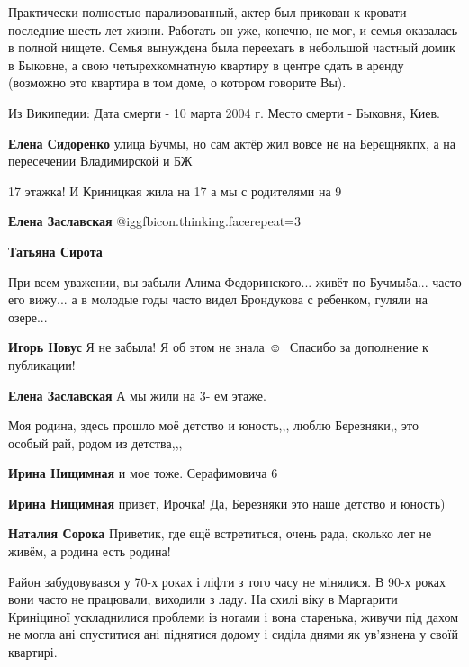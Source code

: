 \begin{itemize}
\begin{itemize}
\begin{itemize}
Практически полностью парализованный, актер был прикован к кровати последние
шесть лет жизни. Работать он уже, конечно, не мог, и семья оказалась в полной
нищете. Семья вынуждена была переехать в небольшой частный домик в Быковне, а
свою четырехкомнатную квартиру в центре сдать в аренду (возможно это квартира в
том доме, о котором говорите Вы).

Из Википедии:
Дата смерти -
10 марта 2004 г.
Место смерти -
Быковня, Киев.

\end{itemize} %

\textbf{Елена Сидоренко} улица Бучмы, но сам актёр жил вовсе не на Берещнякпх, а на пересечении Владимирской и БЖ
\end{itemize} %

17 этажка! И Криницкая жила на 17 а мы с родителями на 9

\begin{itemize} %
\textbf{Елена Заславская}  @igg{fbicon.thinking.face}{repeat=3} 

\textbf{Татьяна Сирота} 

При всем уважении, вы забыли Алима Федоринского... живёт по Бучмы5а... часто его
вижу... а в молодые годы часто видел Брондукова с ребенком, гуляли на озере...


\textbf{Игорь Новус} 
Я не забыла! Я об этом не знала ☺ ️ 
Спасибо за дополнение к публикации!

\textbf{Елена Заславская}
А мы жили на 3- ем этаже.
\end{itemize} %

Моя родина, здесь прошло моё детство и юность,,, люблю Березняки,, это особый
рай, родом из детства,,,

\begin{itemize} %
\textbf{Ирина Нищимная} и мое тоже. Серафимовича 6

\textbf{Ирина Нищимная} привет, Ирочка! Да, Березняки это наше детство и юность)

\textbf{Наталия Сорока} Приветик, где ещё встретиться, очень рада, сколько лет не живём, а родина есть родина!
\end{itemize} %


Район забудовувався у 70-х роках і ліфти з того часу не мінялися. В 90-х роках
вони часто не працювали, виходили з ладу. На схилі віку в Маргарити Криніциної
ускладнилися проблеми із ногами і вона старенька, живучи під дахом не могла ані
спуститися ані піднятися додому і сиділа днями як ув’язнена у своїй квартирі.


\end{itemize}
